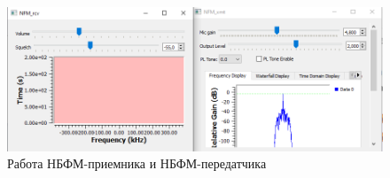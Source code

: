 \documentclass[12pt]{article}
\begin{document}
\begin{figure}[H]
    \centering
    \includegraphics[width=1\textwidth]{pictures/3.png}
    \caption{Работа НБФМ-приемника и НБФМ-передатчика}
\end{figure}

\pagebreak
\end{document}
